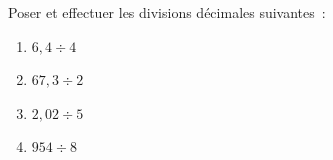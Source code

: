 \documentclass[exercice]{thedocument}%
\begin{document}
%
Poser et effectuer les divisions décimales suivantes~:
\begin{enumerate}
    \item $6,4\div4$
    \item $67,3\div2$
    \item $2,02\div5$
    \item $954\div8$
\end{enumerate}
\end{document}
